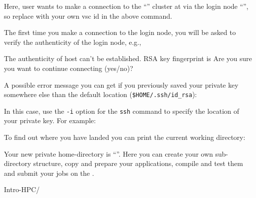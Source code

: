 \begin{prompt}
\end{prompt}

  Here, user \userid wants to make a connection to the ``\hpcname'' cluster at
  \university via the login node ``\loginnode'', so replace \userid with your own
  vsc id in the above command.

  The first time you make a connection to the login node, you will be asked to
  verify the authenticity of the login node, e.g.,

\begin{prompt}
The authenticity of host %
can't be established.
RSA key fingerprint is %
Are you sure you want to continue connecting (yes/no)? %
\end{prompt}

A possible error message you can get if you previously saved your private key
somewhere else than the default location (\verb|$HOME/.ssh/id_rsa|):

\begin{prompt}
\end{prompt}

In this case, use the \verb|-i| option for the \verb|ssh| command to specify the location
of your private key. For example:

\begin{prompt}
\end{prompt}

\fi

To find out where you have landed you can print the current working directory:

\begin{prompt}
\end{prompt}


Your new private home-directory is ``\homedir''.
Here you can create your own sub-directory structure, copy and prepare your
applications, compile and test them and submit your jobs on the \hpc.

\begin{prompt}
Intro-HPC/
\end{prompt}

